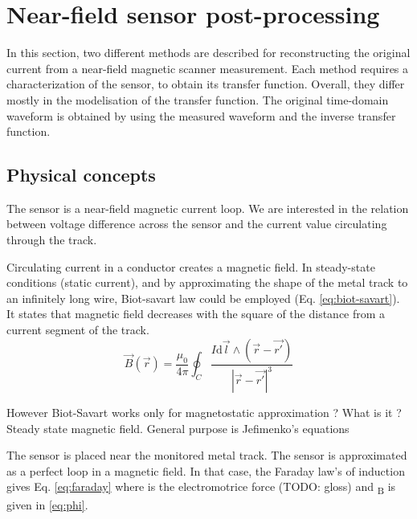 \section{Near-field sensor post-processing}
\label{sec:on-chip-near-field-process}


In this section, two different methods are described for reconstructing the original current from a near-field magnetic scanner measurement.
Each method requires a characterization of the sensor, to obtain its transfer function.
Overall, they differ mostly in the modelisation of the transfer function.
The original time-domain waveform is obtained by using the measured waveform and the inverse transfer function.

\subsection{Physical concepts}
\label{sec:phys-concepts-nfs}

The sensor is a near-field magnetic current loop.
We are interested in the relation between voltage difference across the sensor and the current value circulating through the track.

Circulating current in a conductor creates a magnetic field.
In steady-state conditions (static current), and by approximating the shape of the metal track to an infinitely long wire, Biot-savart law could be employed (Eq. \ref{eq:biot-savart}).
It states that magnetic field decreases with the square of the distance from a current segment of the track.
\begin{equation}
  \label{eq:biot-savart}
  \overrightarrow{B}(\overrightarrow{r}) = \frac{\mu_{0}}{4\pi}\oint_{C}\frac{I \mathrm{d}\overrightarrow{l} \wedge (\overrightarrow{r} - \overrightarrow{r'}) }{|\overrightarrow{r} - \overrightarrow{r'}|^3}
\end{equation}

However Biot-Savart works only for magnetostatic approximation ? What is it ?
Steady state magnetic field.
General purpose is Jefimenko's equations

The sensor is placed near the monitored metal track.
The sensor is approximated as a perfect loop in a magnetic field.
In that case, the Faraday law's of induction gives Eq. \ref{eq:faraday}
where \textepsilon{} is the electromotrice force (TODO: gloss) and \textPhi{}\textsubscript{B} is given in \ref{eq:phi}.

